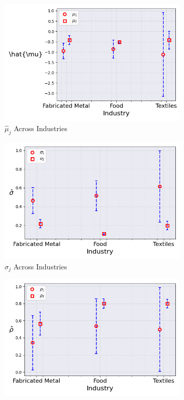 \documentclass{article}
\begin{document}
\begin{figure}[ht!]
\begin{subfigure}[t]{0.32\textwidth}
        \includegraphics[width=\textwidth]{figure/ar1_mixture_mubar_across_industries_m2.png}
        \caption{$\hat{\mu}_j$ Across Industries}
    \end{subfigure}
    \begin{subfigure}[t]{0.32\textwidth}
        \centering
        \includegraphics[width=\textwidth]{figure/ar1_mixture_sigma_across_industries_m2.png}
        \caption{$\hat\sigma_j$ Across Industries}
    \end{subfigure}
    \begin{subfigure}[t]{0.32\textwidth}
        \centering
        \includegraphics[width=\textwidth]{figure/ar1_mixture_rho_across_industries_m2.png}

\end{subfigure}
\end{figure}
\end{document}
